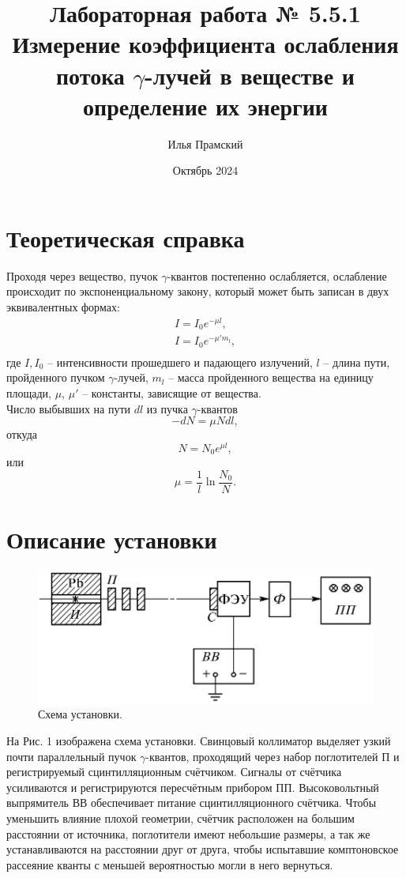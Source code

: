 \documentclass[a4paper,12pt]{article}
\title{Лабораторная работа № 5.5.1\\Измерение коэффициента ослабления потока $\gamma$-лучей в веществе и определение их энергии}
\author{Илья Прамский}
\date{Октябрь 2024}
\begin{document}
\maketitle
\newpage
\section{Теоретическая справка}
Проходя через вещество, пучок $\gamma$-квантов постепенно ослабляется, ослабление происходит по экспоненциальному закону, который может быть записан в двух эквивалентных формах:
\[\begin{array}{l}
I = I_0 e^{-\mu l} ,\\
I = I_0 e^{-\mu' m_l},\\
\end{array}\]
где $I, I_0$ -- интенсивности прошедшего и падающего излучений, $l$ -- длина пути, пройденного пучком $\gamma$-лучей, $m_l$ -- масса пройденного вещества на единицу площади, $\mu$, $\mu'$ -- константы, зависящие от вещества.\\
Число выбывших на пути $dl$ из пучка $\gamma$-квантов
\[-dN = \mu N dl,\]
откуда
\[N = N_0 e^{\mu l},\]
или
\begin{equation}
\mu = \dfrac{1}{l} \ln \dfrac{N_0}{N}.
\end{equation}

\section*{Описание установки}
\begin{figure}[h]
\includegraphics[scale=0.5]{1.png}
\centering
\caption{Схема установки.}
\end{figure}
На Рис. 1 изображена схема установки. Свинцовый коллиматор выделяет узкий почти параллельный пучок $\gamma$-квантов, проходящий через набор поглотителей П и регистрируемый сцинтилляционным счётчиком. Сигналы от счётчика усиливаются и регистрируются пересчётным прибором ПП. Высоковольтный выпрямитель ВВ обеспечивает питание сцинтилляционного счётчика. Чтобы уменьшить влияние плохой геометрии, счётчик расположен на большим расстоянии от источника, поглотители имеют небольшие размеры, а так же устанавливаются на расстоянии друг от друга, чтобы испытавшие комптоновское рассеяние кванты с меньшей вероятностью могли в него вернуться.
\end{document}
